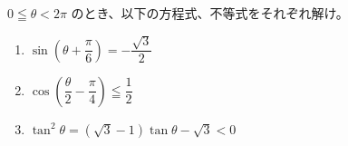 \documentclass[8pt,dvipdfmx]{article}[b5paper]
\begin{document}
\begin{tcolorbox}[title=数学\textcircled{\scriptsize 3} 1-3 BC]
$0 \leqq \theta < 2\pi$ のとき、以下の方程式、不等式をそれぞれ解け。
  \begin{enumerate}[(1)]
    \item $\sin\left(\theta + \dfrac{\pi}{6}\right) = -\dfrac{\sqrt{3}}{2}$
        \item $\cos\left(\dfrac{\theta}{2} - \dfrac{\pi}{4}\right) \leqq \dfrac{1}{2}$
        \item $\tan^2 \theta = (\sqrt{3} - 1)\tan \theta - \sqrt{3} < 0$
   
  \end{enumerate}
\end{tcolorbox}
\end{document}
